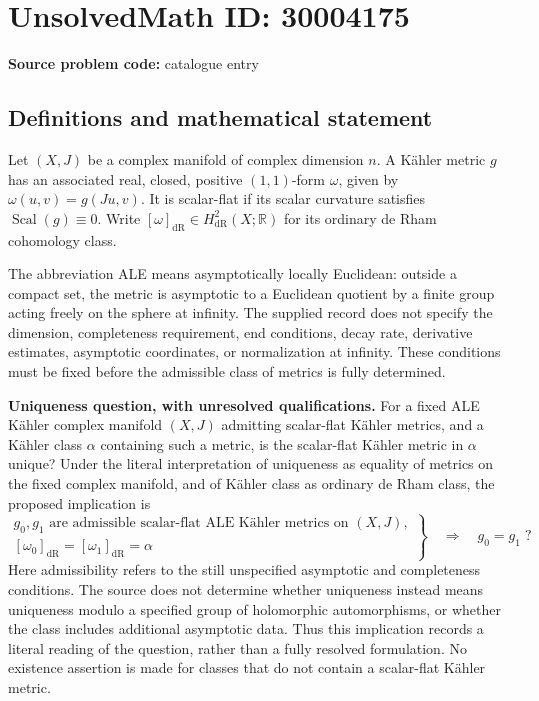 \documentclass[11pt]{article}
\newcommand{\R}{\mathbb{R}}
\begin{document}
\section*{UnsolvedMath ID: 30004175}
\textbf{Source problem code:} catalogue entry
\subsection{Definitions and mathematical statement}
Let \((X,J)\) be a complex manifold of complex dimension \(n\). A Kähler metric \(g\) has an associated real, closed, positive \((1,1)\)-form \(\omega\), given by \(\omega(u,v)=g(Ju,v)\). It is scalar-flat if its scalar curvature satisfies \(\operatorname{Scal}(g)\equiv 0\). Write \([\omega]_{\mathrm{dR}}\in H^2_{\mathrm{dR}}(X;\R)\) for its ordinary de Rham cohomology class.

The abbreviation ALE means asymptotically locally Euclidean: outside a compact set, the metric is asymptotic to a Euclidean quotient by a finite group acting freely on the sphere at infinity. The supplied record does not specify the dimension, completeness requirement, end conditions, decay rate, derivative estimates, asymptotic coordinates, or normalization at infinity. These conditions must be fixed before the admissible class of metrics is fully determined.

\textbf{Uniqueness question, with unresolved qualifications.} For a fixed ALE Kähler complex manifold \((X,J)\) admitting scalar-flat Kähler metrics, and a Kähler class \(\alpha\) containing such a metric, is the scalar-flat Kähler metric in \(\alpha\) unique? Under the literal interpretation of uniqueness as equality of metrics on the fixed complex manifold, and of Kähler class as ordinary de Rham class, the proposed implication is
\[
\left.
\begin{gathered}
 g_0,g_1\text{ are admissible scalar-flat ALE Kähler metrics on }(X,J),\\
 [\omega_0]_{\mathrm{dR}}=[\omega_1]_{\mathrm{dR}}=\alpha
\end{gathered}
\right\}
\quad\Longrightarrow\quad g_0=g_1\;?
\]
Here admissibility refers to the still unspecified asymptotic and completeness conditions. The source does not determine whether uniqueness instead means uniqueness modulo a specified group of holomorphic automorphisms, or whether the class includes additional asymptotic data. Thus this implication records a literal reading of the question, rather than a fully resolved formulation. No existence assertion is made for classes that do not contain a scalar-flat Kähler metric.
\end{document}
